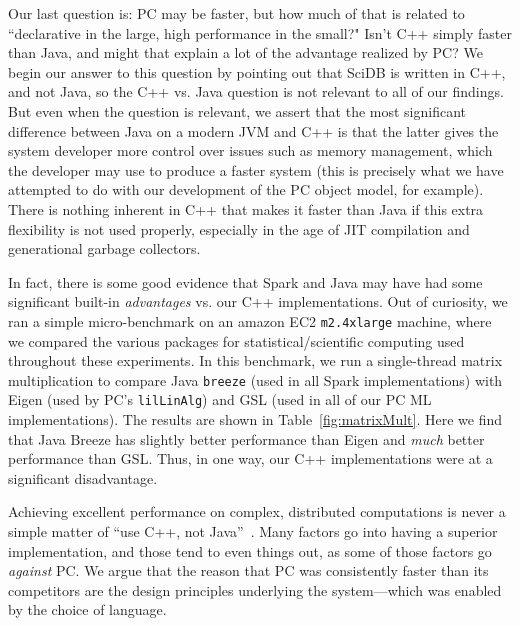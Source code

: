 Our last question is: PC may be faster, but how much of that is related to ``declarative in the large, high performance in 
the small?"   Isn't C++ simply faster than Java, and might that explain a lot of the advantage realized by PC?  We begin
our answer to this question by pointing out that SciDB is written in C++, and not Java, so the C++ vs. Java question is not 
relevant to all of our findings.
But even when the question is relevant, we assert that the most significant
difference between Java on a modern JVM and C++ is that the latter
gives the system developer more control over issues such as memory management, 
which the developer may use to produce a faster system (this is precisely
what we have attempted to do with our development of the PC object model, for example).  
There is nothing inherent in C++ that makes it faster than Java if this extra flexibility is not used properly, 
especially in the age of
JIT compilation and generational garbage collectors.  

In fact, there is some good evidence that Spark and Java may have had some significant
built-in \emph{advantages} vs. our C++ implementations.
Out of curiosity, we ran a simple micro-benchmark on an amazon EC2 \texttt{m2.4xlarge} machine, where we compared the various
packages for statistical/scientific computing used throughout these experiments.
In this benchmark, we run a single-thread matrix multiplication
to compare Java \texttt{breeze} (used in all Spark implementations) 
with Eigen (used by PC's \texttt{lilLinAlg}) and GSL (used in all of our PC ML implementations).
The results are shown in Table~\ref{fig:matrixMult}.  
Here we find that Java Breeze has slightly better performance than Eigen and \emph{much}
better performance than GSL.  
Thus, in one way, our C++ implementations were at a significant disadvantage.

Achieving excellent performance on complex, distributed computations is never a simple matter
of ``use C++, not Java''~\cite{ousterhout2015making, shi2015clash}.  Many factors go into having a superior implementation, and those tend to even things out,
as some of those factors 
go \emph{against} PC.  We argue that the reason that PC was consistently faster
than its competitors are the design principles underlying the
system---which was enabled by the choice of language.


